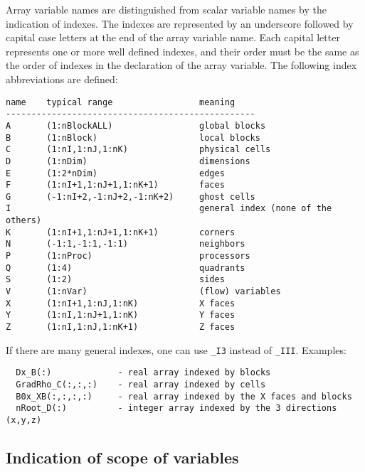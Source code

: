 Array variable names are distinguished from scalar variable names
by the indication of indexes. The indexes are represented by 
an underscore followed by capital case letters at the end 
of the array variable name. Each capital letter represents
one or more well defined indexes, and their order must be the
same as the order of indexes in the declaration of the array variable.
The following index abbreviations are defined:
\begin{verbatim}
name    typical range                 meaning
-------------------------------------------------
A       (1:nBlockALL)                 global blocks
B       (1:nBlock)                    local blocks
C       (1:nI,1:nJ,1:nK)              physical cells
D       (1:nDim)                      dimensions
E       (1:2*nDim)                    edges
F       (1:nI+1,1:nJ+1,1:nK+1)        faces
G       (-1:nI+2,-1:nJ+2,-1:nK+2)     ghost cells
I                                     general index (none of the others)
K       (1:nI+1,1:nJ+1,1:nK+1)        corners
N       (-1:1,-1:1,-1:1)              neighbors
P       (1:nProc)                     processors
Q       (1:4)                         quadrants
S       (1:2)                         sides
V       (1:nVar)                      (flow) variables
X       (1:nI+1,1:nJ,1:nK)            X faces
Y       (1:nI,1:nJ+1,1:nK)            Y faces
Z       (1:nI,1:nJ,1:nK+1)            Z faces
\end{verbatim}
If there are many general indexes, one can use {\tt \_I3} instead of
{\tt \_III}. Examples:
\begin{verbatim}
  Dx_B(:)             - real array indexed by blocks
  GradRho_C(:,:,:)    - real array indexed by cells
  B0x_XB(:,:,:,:)     - real array indexed by the X faces and blocks
  nRoot_D(:)          - integer array indexed by the 3 directions (x,y,z)
\end{verbatim}

\subsection{Indication of scope of variables}

